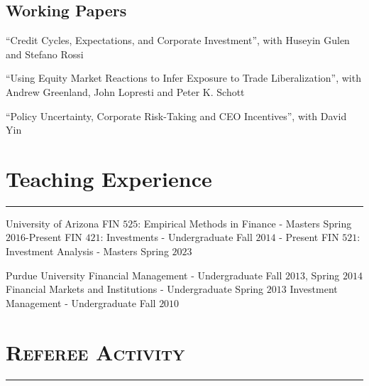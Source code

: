 \documentclass[10pt,letterpaper]{article}
\renewenvironment{itemize}{
  \begin{list}{}{
    \setlength{\leftmargin}{1.5em}
    \setlength{\itemsep}{0.25em}
    \setlength{\parskip}{0pt}
    \setlength{\parsep}{0.25em}
  }
}{
  \end{list}
}
\begin{document}
\subsection*{Working Papers}
\begin{itemize}

\item ``Credit Cycles, Expectations, and Corporate Investment'', with Huseyin Gulen and Stefano Rossi 

\medskip

\item ``Using Equity Market Reactions to Infer Exposure to Trade Liberalization'', with Andrew Greenland, John Lopresti and Peter K. Schott

\medskip

\item ``Policy Uncertainty, Corporate Risk-Taking and CEO Incentives'', with David Yin
\end{itemize}






\section*{Teaching Experience}
\nointerlineskip
\vspace{-3mm}
\rule{\textwidth}{0.5mm}

\begin{itemize}
\item University of Arizona
  \subitem FIN $525$: Empirical Methods in Finance - Masters   \hfill Spring $2016$-Present
  \subitem FIN $421$: Investments - Undergraduate \hfill Fall $2014$ - Present
  \subitem FIN $521$: Investment Analysis - Masters \hfill Spring $2023$

\item Purdue University
  \subitem Financial Management - Undergraduate \hfill Fall $2013$, Spring $2014$
  \subitem Financial Markets and Institutions - Undergraduate \hfill Spring $2013$ 
  \subitem Investment Management - Undergraduate     \hfill Fall $2010$     
 \end{itemize}




\section*{\textsc{Referee Activity}}
\nointerlineskip
\vspace{-3mm}
\rule{\textwidth}{0.5mm}
\end{document}
